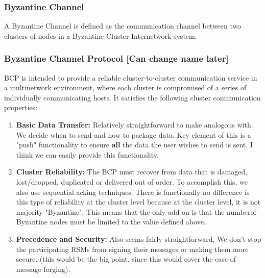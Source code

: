 \subsubsection{Byzantine Channel}
A Byzantine Channel is defined as the communication channel between two clusters of nodes in a Byzantine Cluster Internetwork system.

\subsubsection{Byzantine Channel Protocol [Can change name later]}
BCP is intended to provide a reliable cluster-to-cluster communication service in a multinetwork environment, where each cluster is compromised of a series of individually communicating hosts. It satisfies the following cluster communication properties:
\begin{enumerate}
    \item \textbf{Basic Data Transfer:} Relatively straightforward to make analogous with. We decide when to send and how to package data. Key element of this is a "push" functionality to ensure \textbf{all} the data the user wishes to send is sent. I think we can easily provide this functionality.
    \item \textbf{Cluster Reliability:} The BCP must recover from data that is damaged, lost/dropped, duplicated or delivered out of order.  To accomplish this, we also use sequential acking techniques. There is functionally no difference is this type of reliability at the cluster level because at the cluster level, it is not majority "Byzantine". This means that the only add on is that the numberof Byzantine nodes must be limited to the value defined above.
    \item \textbf{Precedence and Security:} Also seems fairly straightforward, We don't stop the participating RSMs from signing their messages or making them more secure. (this would be the big point, since this would cover the case of message forging).
\end{enumerate}


